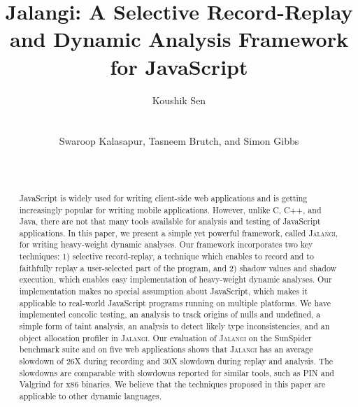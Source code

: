 \documentclass{sig-alternate}
\def\jalangi{\textsc{Jalangi}}
\begin{document}

\title{Jalangi: A Selective Record-Replay and Dynamic Analysis
  Framework for JavaScript} 

\author{
\alignauthor
Koushik Sen\\
      \\
      \\
\alignauthor
Swaroop Kalasapur, Tasneem Brutch, and Simon Gibbs\\
\\
\\
}
\maketitle
\sloppy

\begin{abstract}
  JavaScript is widely used for writing client-side web applications
  and is getting increasingly popular for writing mobile applications.
  However, unlike C, C++, and Java, there are not that many tools
  available for analysis and testing of JavaScript applications.  In
  this paper, we present a simple yet powerful framework, called
  \jalangi{}, for writing heavy-weight dynamic analyses.  Our
  framework incorporates two key techniques: 1) selective
  record-replay, a technique which enables to record and to faithfully
  replay a user-selected part of the program, and 2) shadow values and
  shadow execution, which enables easy implementation of heavy-weight
  dynamic analyses.  Our implementation makes no special assumption
  about JavaScript, which makes it applicable to real-world JavaScript
  programs running on multiple platforms.  We have implemented
  concolic testing, an analysis to track origins of nulls and
  undefined, a simple form of taint analysis, an analysis to detect
  likely type inconsistencies, and an object allocation profiler in
  \jalangi{}.  Our evaluation of \jalangi{} on the SunSpider benchmark
  suite and on five web applications shows that \jalangi{} has an
  average slowdown of 26X during recording and 30X slowdown during
  replay and analysis.  The slowdowns are comparable with slowdowns
  reported for similar tools, such as PIN and Valgrind for x86
  binaries.  We believe that the techniques proposed in this paper are
  applicable to other dynamic languages.
\end{abstract}
\end{document}
